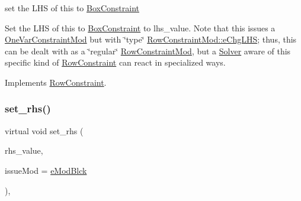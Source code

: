 set the L\+HS of this to \mbox{\hyperlink{class_s_m_spp__di__unipi__it_1_1_box_constraint}{Box\+Constraint}} 

Set the L\+HS of this to \mbox{\hyperlink{class_s_m_spp__di__unipi__it_1_1_box_constraint}{Box\+Constraint}} to lhs\+\_\+value. Note that this issues a \mbox{\hyperlink{class_s_m_spp__di__unipi__it_1_1_one_var_constraint_mod}{One\+Var\+Constraint\+Mod}} but with \char`\"{}type\char`\"{} \mbox{\hyperlink{class_s_m_spp__di__unipi__it_1_1_row_constraint_mod_af91e41a206e988d55a31347acd6f5d33a585aad901188269790f584a365b34813}{Row\+Constraint\+Mod\+::e\+Chg\+L\+HS}}; thus, this can be dealt with as a \char`\"{}regular\char`\"{} \mbox{\hyperlink{class_s_m_spp__di__unipi__it_1_1_row_constraint_mod}{Row\+Constraint\+Mod}}, but a \mbox{\hyperlink{class_s_m_spp__di__unipi__it_1_1_solver}{Solver}} aware of this specific kind of \mbox{\hyperlink{class_s_m_spp__di__unipi__it_1_1_row_constraint}{Row\+Constraint}} can react in specialized ways. 

Implements \mbox{\hyperlink{class_s_m_spp__di__unipi__it_1_1_row_constraint_a1e707449bc5e308a84fbb17197e184a6}{Row\+Constraint}}.

\mbox{\label{class_s_m_spp__di__unipi__it_1_1_box_constraint_a921fe527a5e01a2f6568c3d5d233380a}} 
\subsubsection{\texorpdfstring{set\+\_\+rhs()}{set\_rhs()}}
{\footnotesize\ttfamily virtual void set\+\_\+rhs (\begin{DoxyParamCaption}\item[{\mbox{\hyperlink{class_s_m_spp__di__unipi__it_1_1_row_constraint_a34abd4b01d3a2024be5f6d13dd88779f}{c\+\_\+\+R\+H\+S\+Value}}}]{rhs\+\_\+value,  }\item[{\mbox{\hyperlink{group___modification___t_y_p_e_s_ga544246d8c462e9a2d817c2c30797968f}{c\+\_\+\+Mod\+Param}}}]{issue\+Mod = {\ttfamily \mbox{\hyperlink{group___modification___t_y_p_e_s_gga48fddcdd03a03f49b7e389ca1ed938d4a21b14b26b1c0093a0905f6fc010bad29}{e\+Mod\+Blck}}} }\end{DoxyParamCaption})\hspace{0.3cm}{\ttfamily [override]}, {\ttfamily [virtual]}}



